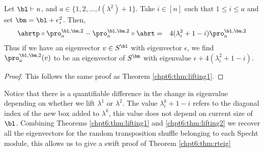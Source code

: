 \documentclass[11pt]{report}
\begin{document}
\begin{thm}
	\label{chpt6:thm:lifting2}
	Let $\bl \vdash n$, and  $a \in \{1,2,\ldots,l(\lambda^{2})+1\}$. Take $i\in [n]$ such that  $1 \leq i \leq a$ and set $\bm = \bl +e_{i}^{2}$. Then,
	\begin{eqnarray*}
		\abrtp\circ \pro^{\bl,\bm,2}_{a}  - 
		\pro^{\bl,\bm,2}_{a}  \circ \abrt & = & 
		4(\lambda^{2}_{i}+1-i) \pro^{\bl,\bm,2}_{a} 
	\end{eqnarray*}
	Thus if we have an eigenvector $v \in S^{\bl}$ with 
	eigenvector $\epsilon$, we find 
	$\pro^{\bl,\bm,2}_{a} (v)$ to be an eigenvector of
	$S^{\bm}$ with eigenvalue $\epsilon +	4(\lambda^{2}_{i}+1-i)$.
\end{thm}
\begin{proof}
	This follows the same proof as Theorem \ref{chpt6:thm:lifting1}.
\end{proof}

Notice that there is a quantifiable difference in the change in eigenvalue depending on whether we lift $\lambda^{1}$ or $\lambda^{2}$. The value $\lambda_{i}^{k} +1 -i$ refers to the diagonal index of the new box added to $\lambda^{k}$, this value does not depend on current size of $\bl$. 
Combining Theorems \ref{chpt6:thm:lifting1} and \ref{chpt6:thm:lifting2} we recover all the eigenvectors for the random transposition shuffle belonging to each Specht module, this allows us to give a swift proof of Theorem \ref{chpt6:thm:rteig}
\end{document}
